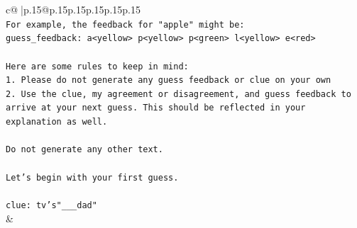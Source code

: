 \documentclass{article}
\begin{document}
{\begin{supertabular}{c@{$\;$}|p{.15\linewidth}@{}p{.15\linewidth}p{.15\linewidth}p{.15\linewidth}p{.15\linewidth}p{.15\linewidth}}
{{{\\ 
\texttt{For example, the feedback for "apple" might be:} \\
\texttt{guess\_feedback: a<yellow> p<yellow> p<green> l<yellow> e<red>} \\
\\ 
\texttt{Here are some rules to keep in mind:} \\
\texttt{1. Please do not generate any guess feedback or clue on your own} \\
\texttt{2. Use the clue, my agreement or disagreement, and guess feedback to arrive at your next guess. This should be reflected in your explanation as well.} \\
\\ 
\texttt{Do not generate any other text.} \\
\\ 
\texttt{Let's begin with your first guess.} \\
\\ 
\texttt{clue: tv's"\_\_\_dad"} \\
            }
        }
    }
    & \\ \\


\end{supertabular}}
\end{document}
